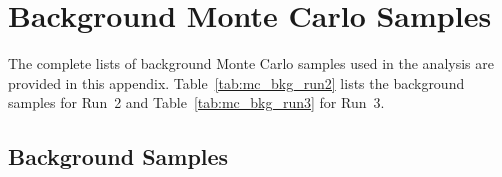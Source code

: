 \chapter{Background Monte Carlo Samples}
\label{app:mc_samples}

The complete lists of background Monte Carlo samples used in the analysis are provided in this appendix. Table~\ref{tab:mc_bkg_run2} lists the background samples for Run~2 and Table~\ref{tab:mc_bkg_run3} for Run~3.

\section*{Background Samples}

